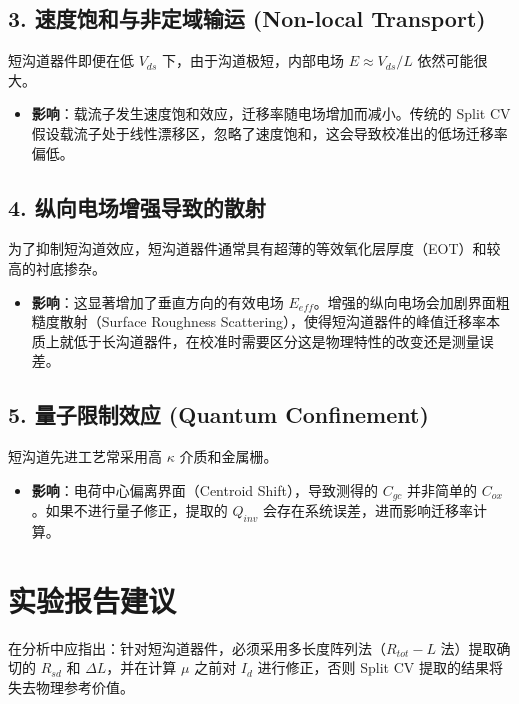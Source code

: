 \documentclass[11pt,a4paper]{article}
\begin{document}
\subsection{3. 速度饱和与非定域输运 (Non-local Transport)}
短沟道器件即便在低 $V_{ds}$ 下，由于沟道极短，内部电场 $E \approx V_{ds}/L$ 依然可能很大。
\begin{itemize}
    \item \textbf{影响}：载流子发生速度饱和效应，迁移率随电场增加而减小。传统的 Split CV 假设载流子处于线性漂移区，忽略了速度饱和，这会导致校准出的低场迁移率偏低。
\end{itemize}

\subsection{4. 纵向电场增强导致的散射}
为了抑制短沟道效应，短沟道器件通常具有超薄的等效氧化层厚度（EOT）和较高的衬底掺杂。
\begin{itemize}
    \item \textbf{影响}：这显著增加了垂直方向的有效电场 $E_{eff}$。增强的纵向电场会加剧界面粗糙度散射（Surface Roughness Scattering），使得短沟道器件的峰值迁移率本质上就低于长沟道器件，在校准时需要区分这是物理特性的改变还是测量误差。
\end{itemize}

\subsection{5. 量子限制效应 (Quantum Confinement)}
短沟道先进工艺常采用高 $\kappa$ 介质和金属栅。
\begin{itemize}
    \item \textbf{影响}：电荷中心偏离界面（Centroid Shift），导致测得的 $C_{gc}$ 并非简单的 $C_{ox}$。如果不进行量子修正，提取的 $Q_{inv}$ 会存在系统误差，进而影响迁移率计算。
\end{itemize}

\section{实验报告建议}
在分析中应指出：针对短沟道器件，必须采用多长度阵列法（$R_{tot}-L$ 法）提取确切的 $R_{sd}$ 和 $\Delta L$，并在计算 $\mu$ 之前对 $I_d$ 进行修正，否则 Split CV 提取的结果将失去物理参考价值。
\end{document}
